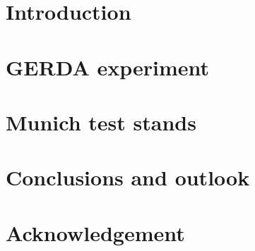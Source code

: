 \documentclass[11pt,a4]{book}
\begin{document}


 

\tableofcontents
\clearpage
{}
\setcounter{page}{1}

\chapter{Introduction}
\label{cha:intro}


\chapter{GERDA experiment}
\label{cha:gerda}


\chapter{Munich test stands}
\label{cha:teststand}


\chapter{Conclusions and outlook}
\label{cha:con}


\chapter*{Acknowledgement}
\label{cha:ack}
 

\begin{thebibliography}{99}
  
\end{thebibliography}
\end{document}
